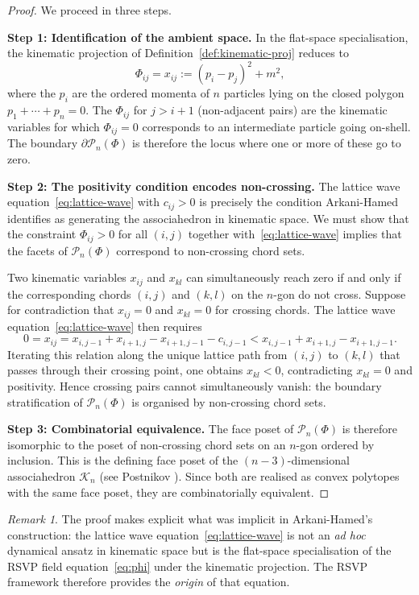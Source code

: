 \documentclass[12pt, oneside]{amsart}
\theoremstyle{plain}
\theoremstyle{definition}
\theoremstyle{remark}
\newtheorem{remark}[theorem]{Remark}
\newcommand{\Assoc}{\mathcal{K}_n}
\begin{document}
\begin{proof}
We proceed in three steps.

\textbf{Step 1: Identification of the ambient space.} In the flat-space specialisation, the kinematic projection of Definition~\ref{def:kinematic-proj} reduces to
\[
  \Phi_{ij} = x_{ij} := (p_i - p_j)^2 + m^2,
\]
where the $p_i$ are the ordered momenta of $n$ particles lying on the closed polygon $p_1 + \cdots + p_n = 0$. The $\Phi_{ij}$ for $j > i+1$ (non-adjacent pairs) are the kinematic variables for which $\Phi_{ij} = 0$ corresponds to an intermediate particle going on-shell. The boundary $\partial\mathcal{P}_n(\Phi)$ is therefore the locus where one or more of these go to zero.

\textbf{Step 2: The positivity condition encodes non-crossing.} The lattice wave equation~\eqref{eq:lattice-wave} with $c_{ij} > 0$ is precisely the condition Arkani-Hamed identifies as generating the associahedron in kinematic space. We must show that the constraint $\Phi_{ij} > 0$ for all $(i,j)$ together with~\eqref{eq:lattice-wave} implies that the facets of $\mathcal{P}_n(\Phi)$ correspond to non-crossing chord sets.

Two kinematic variables $x_{ij}$ and $x_{kl}$ can simultaneously reach zero if and only if the corresponding chords $(i,j)$ and $(k,l)$ on the $n$-gon do not cross. Suppose for contradiction that $x_{ij} = 0$ and $x_{kl} = 0$ for crossing chords. The lattice wave equation~\eqref{eq:lattice-wave} then requires
\[
  0 = x_{ij} = x_{i,j-1} + x_{i+1,j} - x_{i+1,j-1} - c_{i,j-1} < x_{i,j-1} + x_{i+1,j} - x_{i+1,j-1}.
\]
Iterating this relation along the unique lattice path from $(i,j)$ to $(k,l)$ that passes through their crossing point, one obtains $x_{kl} < 0$, contradicting $x_{kl} = 0$ and positivity. Hence crossing pairs cannot simultaneously vanish: the boundary stratification of $\mathcal{P}_n(\Phi)$ is organised by non-crossing chord sets.

\textbf{Step 3: Combinatorial equivalence.} The face poset of $\mathcal{P}_n(\Phi)$ is therefore isomorphic to the poset of non-crossing chord sets on an $n$-gon ordered by inclusion. This is the defining face poset of the $(n-3)$-dimensional associahedron $\Assoc$ (see Postnikov \cite{postnikov2009}). Since both are realised as convex polytopes with the same face poset, they are combinatorially equivalent.
\end{proof}

\begin{remark}
The proof makes explicit what was implicit in Arkani-Hamed's construction: the lattice wave equation~\eqref{eq:lattice-wave} is not an \emph{ad hoc} dynamical ansatz in kinematic space but is the flat-space specialisation of the RSVP field equation~\eqref{eq:phi} under the kinematic projection. The RSVP framework therefore provides the \emph{origin} of that equation.
\end{remark}
\end{document}
